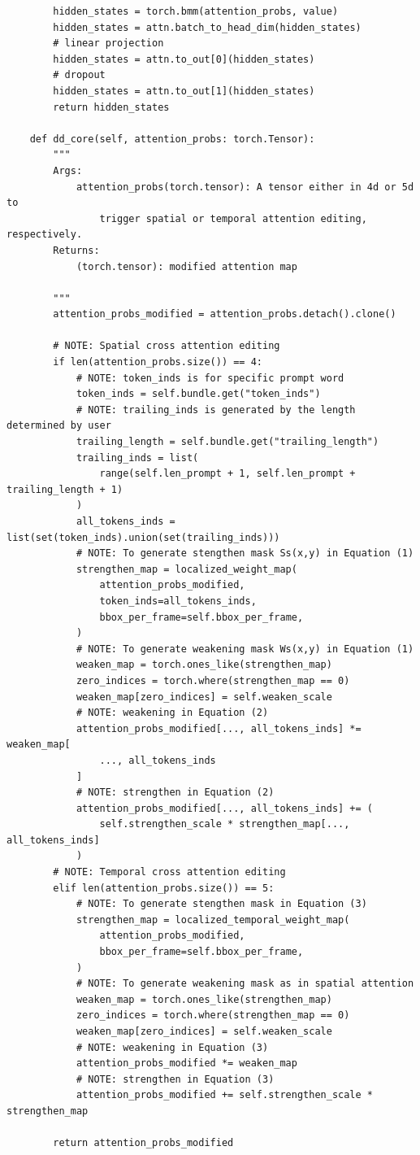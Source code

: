 \begin{tiny}
\begin{verbatim}
        hidden_states = torch.bmm(attention_probs, value)
        hidden_states = attn.batch_to_head_dim(hidden_states)
        # linear projection
        hidden_states = attn.to_out[0](hidden_states)
        # dropout
        hidden_states = attn.to_out[1](hidden_states)
        return hidden_states

    def dd_core(self, attention_probs: torch.Tensor):
        """
        Args:
            attention_probs(torch.tensor): A tensor either in 4d or 5d to
                trigger spatial or temporal attention editing, respectively.
        Returns:
            (torch.tensor): modified attention map

        """
        attention_probs_modified = attention_probs.detach().clone()

        # NOTE: Spatial cross attention editing
        if len(attention_probs.size()) == 4:
            # NOTE: token_inds is for specific prompt word
            token_inds = self.bundle.get("token_inds")
            # NOTE: trailing_inds is generated by the length determined by user
            trailing_length = self.bundle.get("trailing_length")
            trailing_inds = list(
                range(self.len_prompt + 1, self.len_prompt + trailing_length + 1)
            )
            all_tokens_inds = list(set(token_inds).union(set(trailing_inds)))
            # NOTE: To generate stengthen mask Ss(x,y) in Equation (1)
            strengthen_map = localized_weight_map(
                attention_probs_modified,
                token_inds=all_tokens_inds,
                bbox_per_frame=self.bbox_per_frame,
            )
            # NOTE: To generate weakening mask Ws(x,y) in Equation (1)
            weaken_map = torch.ones_like(strengthen_map)
            zero_indices = torch.where(strengthen_map == 0)
            weaken_map[zero_indices] = self.weaken_scale
            # NOTE: weakening in Equation (2)
            attention_probs_modified[..., all_tokens_inds] *= weaken_map[
                ..., all_tokens_inds
            ]
            # NOTE: strengthen in Equation (2)
            attention_probs_modified[..., all_tokens_inds] += (
                self.strengthen_scale * strengthen_map[..., all_tokens_inds]
            )
        # NOTE: Temporal cross attention editing
        elif len(attention_probs.size()) == 5:
            # NOTE: To generate stengthen mask in Equation (3)
            strengthen_map = localized_temporal_weight_map(
                attention_probs_modified,
                bbox_per_frame=self.bbox_per_frame,
            )
            # NOTE: To generate weakening mask as in spatial attention
            weaken_map = torch.ones_like(strengthen_map)
            zero_indices = torch.where(strengthen_map == 0)
            weaken_map[zero_indices] = self.weaken_scale
            # NOTE: weakening in Equation (3)
            attention_probs_modified *= weaken_map
            # NOTE: strengthen in Equation (3)
            attention_probs_modified += self.strengthen_scale * strengthen_map

        return attention_probs_modified

\end{verbatim}
\end{tiny}